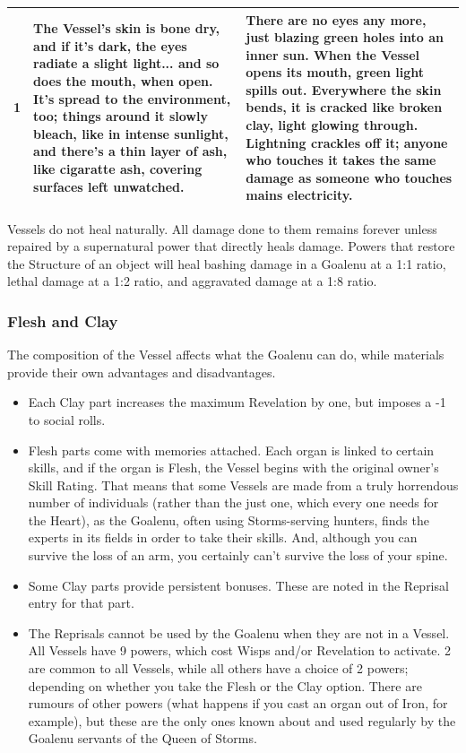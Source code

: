 \begin{table}[H]
\begin{tabularx}{\textwidth}{|l|X|X|}
        1          & The Vessel's skin is bone dry, and if it's dark, the eyes radiate a slight light... and so does the mouth, when open. It's spread to the environment, too; things around it slowly bleach, like in intense sunlight, and there's a thin layer of ash, like cigaratte ash, covering surfaces left unwatched.  & There are no eyes any more, just blazing green holes into an inner sun. When the Vessel opens its mouth, green light spills out. Everywhere the skin bends, it is cracked like broken clay, light glowing through. Lightning crackles off it; anyone who touches it takes the same damage as someone who touches mains electricity.  \\
        \hline
    \end{tabularx}
\end{table}

Vessels do not heal naturally. All damage done to them remains forever unless repaired by a supernatural power that directly heals damage. Powers that restore the Structure of an object will heal bashing damage in a Goalenu at a 1:1 ratio, lethal damage at a 1:2 ratio, and aggravated damage at a 1:8 ratio.

\subsubsection*{Flesh and Clay}

The composition of the Vessel affects what the Goalenu can do, while materials provide their own advantages and disadvantages. 

\begin{itemize}
 \item     Each Clay part increases the maximum Revelation by one, but imposes a -1 to social rolls. 
    \item     Flesh parts come with memories attached. Each organ is linked to certain skills, and if the organ is Flesh, the Vessel begins with the original owner’s Skill Rating. That means that some Vessels are made from a truly horrendous number of individuals (rather than the just one, which every one needs for the Heart), as the Goalenu, often using Storms-serving hunters, finds the experts in its fields in order to take their skills. And, although you can survive the loss of an arm, you certainly can’t survive the loss of your spine.
    \item     Some Clay parts provide persistent bonuses. These are noted in the Reprisal entry for that part.
    \item     The Reprisals cannot be used by the Goalenu when they are not in a Vessel. All Vessels have 9 powers, which cost Wisps and/or Revelation to activate. 2 are common to all Vessels, while all others have a choice of 2 powers; depending on whether you take the Flesh or the Clay option. There are rumours of other powers (what happens if you cast an organ out of Iron, for example), but these are the only ones known about and used regularly by the Goalenu servants of the Queen of Storms. 
\end{itemize}


